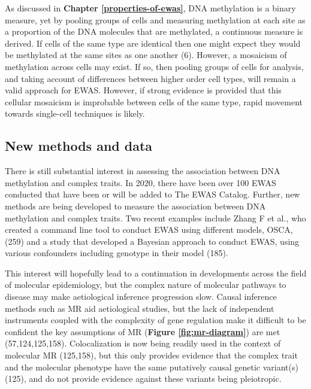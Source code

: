 \documentclass[11pt,oneside]{bristolthesis}
\begin{document}
As discussed in \textbf{Chapter \ref{properties-of-ewas}}, DNA methylation is a binary measure, yet by pooling groups of cells and measuring methylation at each site as a proportion of the DNA molecules that are methylated, a continuous measure is derived. If cells of the same type are identical then one might expect they would be methylated at the same sites as one another (6). However, a mosaicism of methylation across cells may exist. If so, then pooling groups of cells for analysis, and taking account of differences between higher order cell types, will remain a valid approach for EWAS. However, if strong evidence is provided that this cellular mosaicism is improbable between cells of the same type, rapid movement towards single-cell techniques is likely.

\hypertarget{new-methods-and-data}{%
\subsection{New methods and data}\label{new-methods-and-data}}

There is still substantial interest in assessing the association between DNA methylation and complex traits. In 2020, there have been over 100 EWAS conducted that have been or will be added to The EWAS Catalog. Further, new methods are being developed to measure the association between DNA methylation and complex traits. Two recent examples include Zhang F et al., who created a command line tool to conduct EWAS using different models, OSCA, (259) and a study that developed a Bayesian approach to conduct EWAS, using various confounders including genotype in their model (185).

This interest will hopefully lead to a continuation in developments across the field of molecular epidemiology, but the complex nature of molecular pathways to disease may make aetiological inference progression slow. Causal inference methods such as MR aid aetiological studies, but the lack of independent instruments coupled with the complexity of gene regulation make it difficult to be confident the key assumptions of MR (\textbf{Figure \ref{fig:mr-diagram}}) are met (57,124,125,158). Colocalization is now being readily used in the context of molecular MR (125,158), but this only provides evidence that the complex trait and the molecular phenotype have the same putatively causal genetic variant(s) (125), and do not provide evidence against these variants being pleiotropic.
\end{document}
